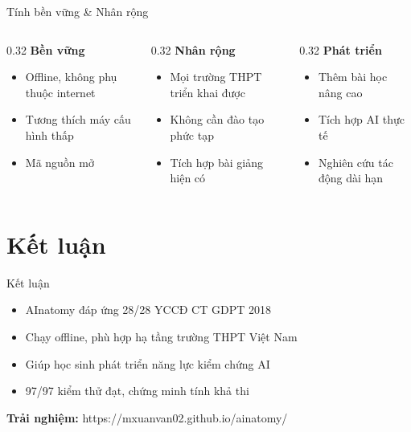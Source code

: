 \documentclass[10pt,xcolor=dvipsnames]{beamer}
\begin{document}
\begin{frame}{Tính bền vững \& Nhân rộng}
  \begin{columns}[T]
    \begin{column}{0.32\textwidth}
      \textbf{Bền vững}
      \begin{itemize}
        \item Offline, không phụ thuộc internet
        \item Tương thích máy cấu hình thấp
        \item Mã nguồn mở
      \end{itemize}
    \end{column}
    
    \begin{column}{0.32\textwidth}
      \textbf{Nhân rộng}
      \begin{itemize}
        \item Mọi trường THPT triển khai được
        \item Không cần đào tạo phức tạp
        \item Tích hợp bài giảng hiện có
      \end{itemize}
    \end{column}
    
    \begin{column}{0.32\textwidth}
      \textbf{Phát triển}
      \begin{itemize}
        \item Thêm bài học nâng cao
        \item Tích hợp AI thực tế
        \item Nghiên cứu tác động dài hạn
      \end{itemize}
    \end{column}
  \end{columns}
\end{frame}

\section{Kết luận}

\begin{frame}{Kết luận}
  \begin{itemize}
    \item AInatomy đáp ứng 28/28 YCCĐ CT GDPT 2018
    \item Chạy offline, phù hợp hạ tầng trường THPT Việt Nam
    \item Giúp học sinh phát triển năng lực kiểm chứng AI
    \item 97/97 kiểm thử đạt, chứng minh tính khả thi
  \end{itemize}
  
  \vspace{1em}
  \centering
  \textbf{Trải nghiệm:} https://mxuanvan02.github.io/ainatomy/
\end{frame}
\end{document}
